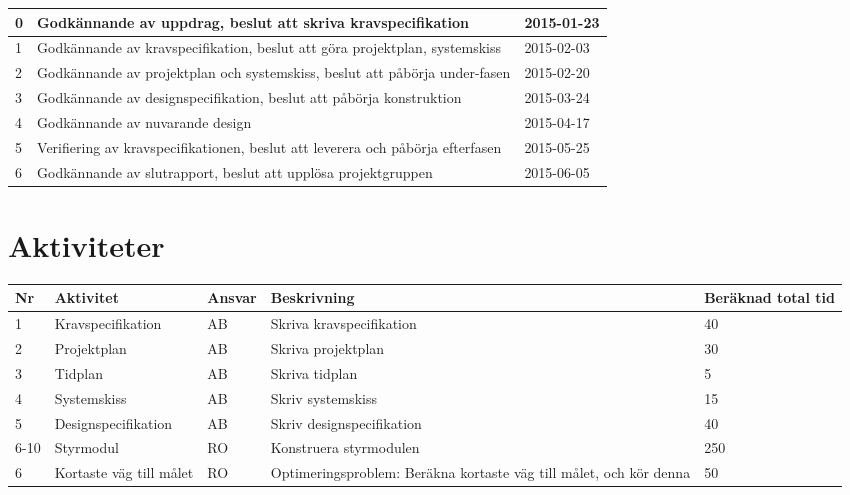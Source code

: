 \documentclass[11pt]{article}
\begin{document}
\begin{flushleft}
\begin{table}[h]
\begin{tabular}{|l|p{.75\linewidth}|l|}
0 &
Godkännande av uppdrag, beslut att skriva kravspecifikation &
2015-01-23 \\ \hline
1 &
Godkännande av kravspecifikation, beslut att göra projektplan, systemskiss &
2015-02-03 \\ \hline
2 &
Godkännande av projektplan och systemskiss, beslut att påbörja under-fasen &
2015-02-20 \\ \hline
3 &
Godkännande av designspecifikation, beslut att påbörja konstruktion &
2015-03-24 \\ \hline
4 &
Godkännande av nuvarande design &
2015-04-17 \\ \hline
5 &
Verifiering av kravspecifikationen, beslut att leverera och påbörja efterfasen &
2015-05-25 \\ \hline
6 &
Godkännande av slutrapport, beslut att upplösa projektgruppen &
2015-06-05 \\ \hline
 
\end{tabular}
\end{table}

\pagebreak

\section{Aktiviteter}
\begin{table}[h]
\begin{tabular}{|l|p{.30\linewidth}|l|p{.40\linewidth}|p{.10\linewidth}|} \hline

Nr & 
Aktivitet & 
Ansvar & 
Beskrivning & 
Beräknad total tid \\[0.1in] \hline

1 &
Kravspecifikation &
AB &
Skriva kravspecifikation &
40 \\ \hline

2 &
Projektplan &
AB &
Skriva projektplan &
30 \\ \hline

3 &
Tidplan &
AB &
Skriva tidplan &
5 \\ \hline
 
4 &
Systemskiss&
AB &
Skriv systemskiss&
15 \\ \hline 
 
5 &
Designspecifikation &
AB &
Skriv designspecifikation &
40 \\ \hline
 
6-10 &
Styrmodul &
RO &
Konstruera styrmodulen &
250 \\ \hline

6 &
Kortaste väg till målet &
RO &
Optimeringsproblem: Beräkna kortaste väg till målet, och kör denna &
50 \\ \hline
 

\end{tabular}
\end{table}
\end{flushleft}
\end{document}
